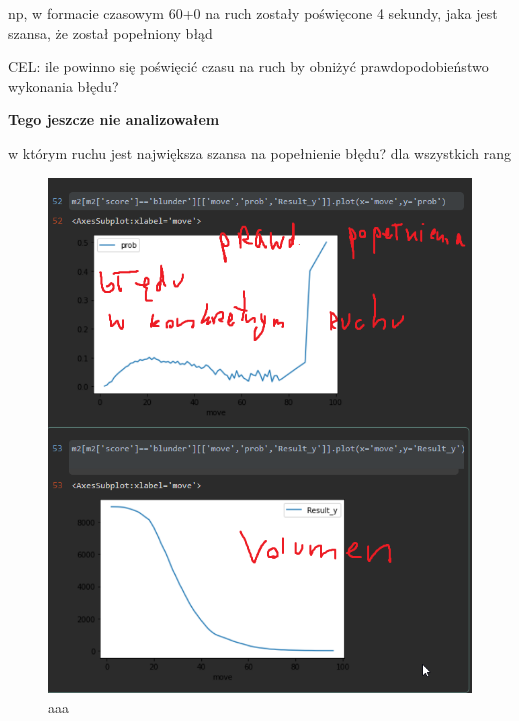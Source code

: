 \documentclass[inzynierska]{pwr_wmat_praca_dyplomowa}
\theoremstyle{plain}
\numberwithin{theorem}{chapter}
\theoremstyle{definition}
\numberwithin{theorem}{chapter}
\begin{document}
np, w formacie czasowym 60+0 na ruch zostały poświęcone 4 sekundy, jaka jest szansa, że został popełniony błąd \newline


CEL: 
ile powinno się poświęcić czasu na ruch by obniżyć prawdopodobieństwo wykonania błędu?\newline


\textbf{Tego jeszcze nie analizowałem}



w którym ruchu jest największa szansa na popełnienie błędu?
dla wszystkich rang
\begin{figure}[H]
	\centering
	\includegraphics[width=\textwidth]{p_od_ruchu.png}
	\caption{aaa}\label{aaa}
\end{figure}
\end{document}
